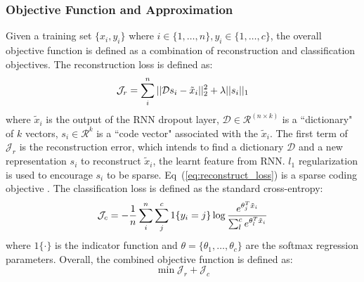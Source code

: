 \documentclass{article}
\begin{document}
\subsubsection{Objective Function and Approximation}
\label{sec:Objective}
Given a training set $\{x_i, y_i\}$ where $i\in\{1,\ldots,n\}, y_i\in \{1,\ldots, c\}$, the overall objective function is defined as a combination of reconstruction and classification objectives.
The reconstruction loss is defined as:
\vspace{-0.05in}
\begin{equation}\label{eq:reconstruct_loss}
\mathcal{J}_r =
\sum_{i}^n||\mathcal{D} s_i - \tilde{x}_i||_2^2 + \lambda ||s_i||_1
\vspace{-0.05in}
\end{equation}
where $\tilde{x}_i$ is the output of the RNN dropout layer, $\mathcal{D}\in \mathcal{R}^{(n\times k)}$ is a ``dictionary" of $k$ vectors,
$s_i\in \mathcal{R}^k$ is a ``code vector" associated with the $\tilde{x}_i$.
The first term of $\mathcal{J}_r$ is the reconstruction error, which intends to find a dictionary $\mathcal{D}$ and a new representation $s_i$ to reconstruct $\tilde{x}_i$, the learnt feature from RNN. $l_1$ regularization is used to encourage $s_i$ to be sparse. Eq~(\ref{eq:reconstruct_loss}) is a sparse coding objective \cite{sparsecoding}.
The classification loss is defined as the standard cross-entropy:
\vspace{-0.05in}
\begin{equation}\label{eq:classify_loss}
\mathcal{J}_c =
-\frac{1}{n}\sum_{i}^n\sum_j^c 1\{y_i=j\} \log\frac{e^{\theta_j^T \tilde{x}_i}}{\sum_l^c e^{\theta_l^T \tilde{x}_i}}
\vspace{-0.05in}
\end{equation}
where $1\{\cdot\}$ is the indicator function and $\theta = \{\theta_1,\ldots,\theta_c\}$ are the softmax regression parameters.
Overall, the combined objective function is defined as:
\begin{equation}\label{eq:multitask_obj}
\min \mathcal{J}_r + \mathcal{J}_c
\end{equation}
\end{document}
